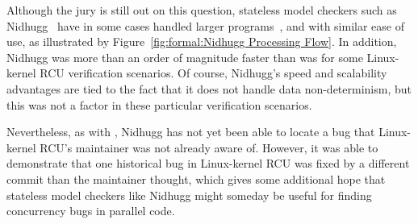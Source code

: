 Although the jury is still out on this question, stateless model
checkers such as Nidhugg~\cite{CarlLeonardsson2014Nidhugg} have in
some cases handled larger programs~\cite{SMC-TreeRCU}, and with
similar ease of use, as illustrated by
Figure~\ref{fig:formal:Nidhugg Processing Flow}.
In addition, Nidhugg was more than an order of magnitude faster than
was  for some Linux-kernel RCU verification scenarios.
Of course, Nidhugg's speed and scalability advantages are tied to
the fact that it does not handle data non-determinism, but this
was not a factor in these particular verification scenarios.

Nevertheless, as with , Nidhugg has not yet been able to
locate a bug that Linux-kernel RCU's maintainer was not already
aware of.
However, it was able to demonstrate that one historical bug in
Linux-kernel RCU was fixed by a different commit than the maintainer
thought, which gives some additional hope that stateless model checkers
like Nidhugg might someday be useful for finding concurrency bugs in
parallel code.
